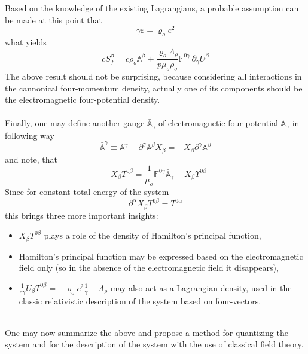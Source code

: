 \documentclass[aps,prx,preprint,groupedaddress,showkeys]{revtex4-2}
\begin{document}
Based on the knowledge of the existing Lagrangians, a probable assumption can be made at this point that
\begin{equation} \label{HQ4e}
\gamma \varepsilon = \varrho_o c^2
\end{equation}
what yields
\begin{equation} \label{HQ4f}
cS_f^{\beta} = c\rho_o \mathbb{A}^{\beta} + \frac{\varrho_o \Lambda_{\rho}}{p \mu_o \rho_o} \mathbb{F}^{0 \gamma} \, \partial_{\gamma} U^{\beta}
\end{equation}
The above result should not be surprising, because considering all interactions in the cannonical four-momentum density, actually one of its components should be the electromagnetic four-potential density.\\
~\\
Finally, one may define another gauge $\bar{\mathbb{A}}_{\gamma}$ of electromagnetic four-potential $\mathbb{A}_{\gamma}$ in following way
\begin{equation} \label{HQ6}
\bar{\mathbb{A}}^{\gamma} \equiv  \mathbb{A}^{\gamma} - \partial^{\gamma} \mathbb{A}^{\beta}X_{\beta} = - X_{\beta} \partial^{\gamma} \mathbb{A}^{\beta}
\end{equation}
and note, that
\begin{equation} \label{HQ7}
- X_{\beta} T^{0 \beta} =  \frac{1}{\mu_o} \mathbb{F}^{0 \gamma} \bar{\mathbb{A}}_{\gamma} + X_{\beta} \Upsilon^{0 \beta}
\end{equation}
Since for constant total energy of the system
\begin{equation} \label{HQ8}
\partial^{\alpha} X_{\beta} T^{0 \beta} =  T^{0 \alpha}
\end{equation}
this brings three more important insights: 
\begin{itemize}
  \item $X_{\beta} T^{0 \beta}$ plays a role of the density of Hamilton's principal function,
  \item Hamilton's principal function may be expressed based on the electromagnetic field only (so in the absence of the electromagnetic field it disappears),
  \item $\frac{1}{c\gamma} U_{\beta} T^{0 \beta} = - \varrho_oc^2 \frac{1}{\gamma} - \Lambda_{\rho}$ may also act as a Lagrangian density, used in the classic relativistic description of the system based on four-vectors.
\end{itemize}
~\\
One may now summarize the above and propose a method for quantizing the system and for the description of the system with the use of classical field theory.\\
\end{document}
